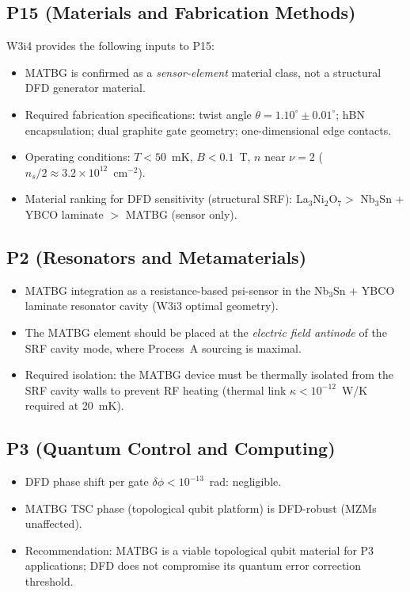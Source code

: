 \documentclass[11pt]{article}
\newcommand{\ee}[1]{\times 10^{#1}}
\newcommand{\nuFill}{\nu}
\begin{document}
\subsection{P15 (Materials and Fabrication Methods)}

W3i4 provides the following inputs to P15:
\begin{itemize}
  \item MATBG is confirmed as a \emph{sensor-element} material class,
    not a structural DFD generator material.
  \item Required fabrication specifications:
    twist angle $\theta = 1.10^\circ \pm 0.01^\circ$;
    hBN encapsulation;
    dual graphite gate geometry;
    one-dimensional edge contacts.
  \item Operating conditions: $T < 50$~mK, $B < 0.1$~T,
    $n$ near $\nuFill = 2$ ($n_s/2 \approx 3.2\ee{12}$~cm$^{-2}$).
  \item Material ranking for DFD sensitivity (structural SRF):
    La$_3$Ni$_2$O$_7 >$ Nb$_3$Sn + YBCO laminate $>$ MATBG (sensor only).
\end{itemize}

\subsection{P2 (Resonators and Metamaterials)}

\begin{itemize}
  \item MATBG integration as a resistance-based psi-sensor in the Nb$_3$Sn
    + YBCO laminate resonator cavity (W3i3 optimal geometry).
  \item The MATBG element should be placed at the \emph{electric field
    antinode} of the SRF cavity mode, where Process~A sourcing is maximal.
  \item Required isolation: the MATBG device must be thermally isolated
    from the SRF cavity walls to prevent RF heating (thermal link
    $\kappa < 10^{-12}$~W/K required at 20~mK).
\end{itemize}

\subsection{P3 (Quantum Control and Computing)}

\begin{itemize}
  \item DFD phase shift per gate $\delta\phi < 10^{-13}$~rad: negligible.
  \item MATBG TSC phase (topological qubit platform) is DFD-robust
    (MZMs unaffected).
  \item Recommendation: MATBG is a viable topological qubit material
    for P3 applications; DFD does not compromise its quantum error
    correction threshold.
\end{itemize}
\end{document}
